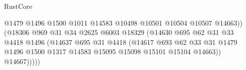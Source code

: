 \begin{lexlean}{RustCore}
\begin{coremodule}
                                                    @1479
                                                    @1496
                                                    @1500
                                                    @1011
                                                    @14583
                                                    @10498
                                                    @10501
                                                    @10504
                                                    @10507
                                                    @14663))
                                                (@18306
                                                  @969
                                                  @31
                                                  @34
                                                  @2625
                                                  @6003
                                                  @18329
                                                  (@14630
                                                    @695
                                                    @62
                                                    @31
                                                    @33
                                                    @4418
                                                    @1496
                                                    (@14637
                                                      @695
                                                      @31
                                                      @4418
                                                      (@14617
                                                        @693
                                                        @62
                                                        @33
                                                        @31
                                                        @1479
                                                        @1496
                                                        @1500
                                                        @1317
                                                        @14583
                                                        @15095
                                                        @15098
                                                        @15101
                                                        @15104
                                                        @14663))
                                                    @14667)))))

\end{coremodule}
\end{lexlean}
